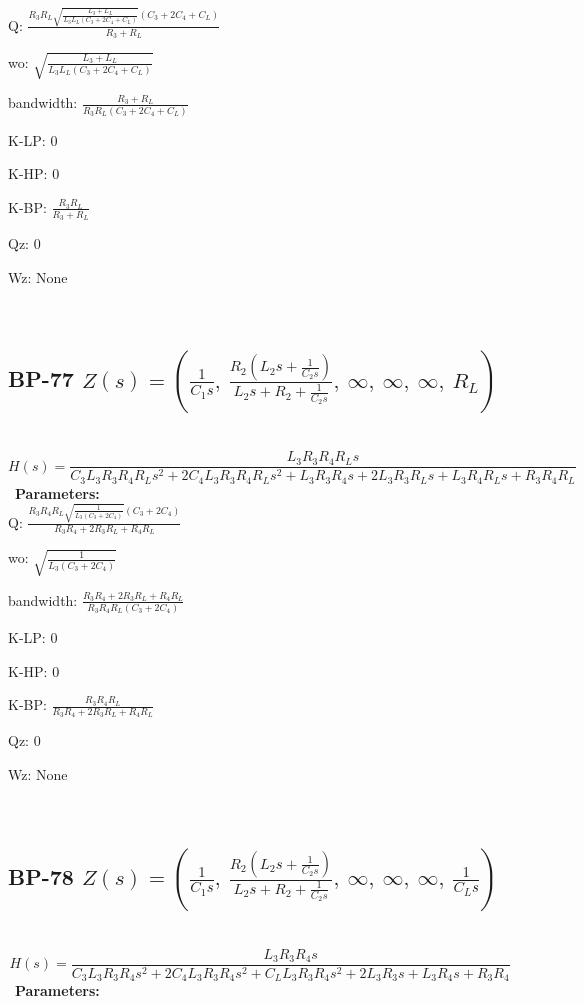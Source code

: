 \documentclass{article}
\begin{document}
Q: $\frac{R_{3} R_{L} \sqrt{\frac{L_{3} + L_{L}}{L_{3} L_{L} \left(C_{3} + 2 C_{4} + C_{L}\right)}} \left(C_{3} + 2 C_{4} + C_{L}\right)}{R_{3} + R_{L}}$\ 

wo: $\sqrt{\frac{L_{3} + L_{L}}{L_{3} L_{L} \left(C_{3} + 2 C_{4} + C_{L}\right)}}$\ 

bandwidth: $\frac{R_{3} + R_{L}}{R_{3} R_{L} \left(C_{3} + 2 C_{4} + C_{L}\right)}$\ 

K-LP: $0$\ 

K-HP: $0$\ 

K-BP: $\frac{R_{3} R_{L}}{R_{3} + R_{L}}$\ 

Qz: $0$\ 

Wz: $\text{None}$\ 

\ 

\subsection{BP-77 $Z(s) = \left( \frac{1}{C_{1} s}, \  \frac{R_{2} \left(L_{2} s + \frac{1}{C_{2} s}\right)}{L_{2} s + R_{2} + \frac{1}{C_{2} s}}, \  \infty, \  \infty, \  \infty, \  R_{L}\right)$ } \ 
\textbf{\[H(s) = \frac{L_{3} R_{3} R_{4} R_{L} s}{C_{3} L_{3} R_{3} R_{4} R_{L} s^{2} + 2 C_{4} L_{3} R_{3} R_{4} R_{L} s^{2} + L_{3} R_{3} R_{4} s + 2 L_{3} R_{3} R_{L} s + L_{3} R_{4} R_{L} s + R_{3} R_{4} R_{L}}\] } \ 
\textbf{Parameters:}\\ 

Q: $\frac{R_{3} R_{4} R_{L} \sqrt{\frac{1}{L_{3} \left(C_{3} + 2 C_{4}\right)}} \left(C_{3} + 2 C_{4}\right)}{R_{3} R_{4} + 2 R_{3} R_{L} + R_{4} R_{L}}$\ 

wo: $\sqrt{\frac{1}{L_{3} \left(C_{3} + 2 C_{4}\right)}}$\ 

bandwidth: $\frac{R_{3} R_{4} + 2 R_{3} R_{L} + R_{4} R_{L}}{R_{3} R_{4} R_{L} \left(C_{3} + 2 C_{4}\right)}$\ 

K-LP: $0$\ 

K-HP: $0$\ 

K-BP: $\frac{R_{3} R_{4} R_{L}}{R_{3} R_{4} + 2 R_{3} R_{L} + R_{4} R_{L}}$\ 

Qz: $0$\ 

Wz: $\text{None}$\ 

\ 

\subsection{BP-78 $Z(s) = \left( \frac{1}{C_{1} s}, \  \frac{R_{2} \left(L_{2} s + \frac{1}{C_{2} s}\right)}{L_{2} s + R_{2} + \frac{1}{C_{2} s}}, \  \infty, \  \infty, \  \infty, \  \frac{1}{C_{L} s}\right)$ } \ 
\textbf{\[H(s) = \frac{L_{3} R_{3} R_{4} s}{C_{3} L_{3} R_{3} R_{4} s^{2} + 2 C_{4} L_{3} R_{3} R_{4} s^{2} + C_{L} L_{3} R_{3} R_{4} s^{2} + 2 L_{3} R_{3} s + L_{3} R_{4} s + R_{3} R_{4}}\] } \ 
\textbf{Parameters:}\\ 
\end{document}
